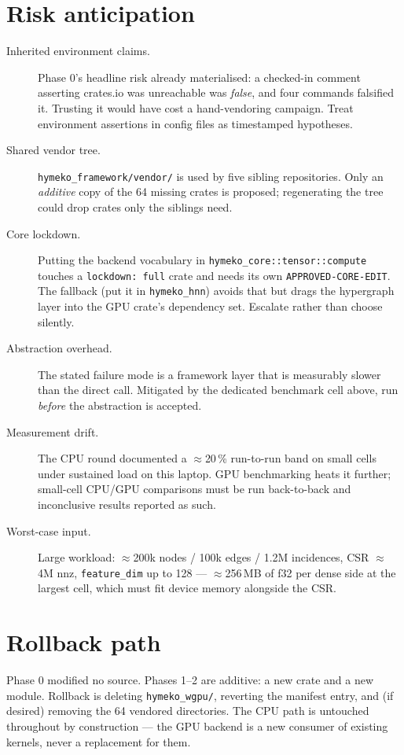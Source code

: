 \documentclass[11pt,a4paper]{article}
\begin{document}
\section{Risk anticipation}
\label{sec:risk}

\begin{description}
  \item[Inherited environment claims.] Phase 0's headline risk already
    materialised: a checked-in comment asserting crates.io was unreachable was
    \emph{false}, and four commands falsified it. Trusting it would have cost a
    hand-vendoring campaign. Treat environment assertions in config files as
    timestamped hypotheses.
  \item[Shared vendor tree.] \texttt{hymeko\_framework/vendor/} is used by five
    sibling repositories. Only an \emph{additive} copy of the 64 missing crates
    is proposed; regenerating the tree could drop crates only the siblings need.
  \item[Core lockdown.] Putting the backend vocabulary in
    \texttt{hymeko\_core::tensor::compute} touches a \texttt{lockdown: full}
    crate and needs its own \texttt{APPROVED-CORE-EDIT}. The fallback (put it in
    \texttt{hymeko\_hnn}) avoids that but drags the hypergraph layer into the GPU
    crate's dependency set. Escalate rather than choose silently.
  \item[Abstraction overhead.] The stated failure mode is a framework layer that
    is measurably slower than the direct call. Mitigated by the dedicated
    benchmark cell above, run \emph{before} the abstraction is accepted.
  \item[Measurement drift.] The CPU round documented a $\approx$20\,\%
    run-to-run band on small cells under sustained load on this laptop. GPU
    benchmarking heats it further; small-cell CPU/GPU comparisons must be run
    back-to-back and inconclusive results reported as such.
  \item[Worst-case input.] Large workload: $\approx$200k nodes / 100k edges /
    1.2M incidences, CSR $\approx$4M nnz, \texttt{feature\_dim} up to 128 ---
    $\approx$256\,MB of f32 per dense side at the largest cell, which must fit
    device memory alongside the CSR.
\end{description}

\section{Rollback path}

Phase 0 modified no source. Phases 1--2 are additive: a new crate and a new
module. Rollback is deleting \texttt{hymeko\_wgpu/}, reverting the manifest
entry, and (if desired) removing the 64 vendored directories. The CPU path is
untouched throughout by construction --- the GPU backend is a new consumer of
existing kernels, never a replacement for them.
\end{document}

